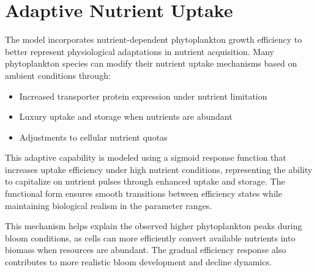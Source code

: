 \section{Adaptive Nutrient Uptake}

The model incorporates nutrient-dependent phytoplankton growth efficiency to better represent physiological adaptations in nutrient acquisition. Many phytoplankton species can modify their nutrient uptake mechanisms based on ambient conditions through:

\begin{itemize}
\item Increased transporter protein expression under nutrient limitation
\item Luxury uptake and storage when nutrients are abundant
\item Adjustments to cellular nutrient quotas
\end{itemize}

This adaptive capability is modeled using a sigmoid response function that increases uptake efficiency under high nutrient conditions, representing the ability to capitalize on nutrient pulses through enhanced uptake and storage. The functional form ensures smooth transitions between efficiency states while maintaining biological realism in the parameter ranges.

This mechanism helps explain the observed higher phytoplankton peaks during bloom conditions, as cells can more efficiently convert available nutrients into biomass when resources are abundant. The gradual efficiency response also contributes to more realistic bloom development and decline dynamics.
